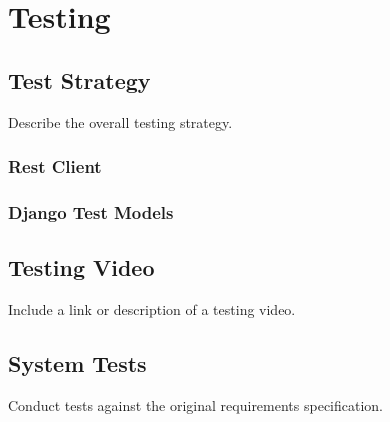 \chapter{Testing}

\section{Test Strategy}
Describe the overall testing strategy.

\subsection{Rest Client}
\subsection{Django Test Models}

\section{Testing Video}
Include a link or description of a testing video.

\section{System Tests}
Conduct tests against the original requirements specification.



